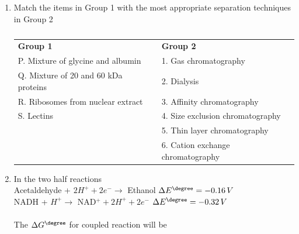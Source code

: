 \documentclass[journal,12pt,onecolumn]{IEEEtran}
\theoremstyle{remark}
\begin{document}
\begin{enumerate}
\begin{enumerate}
\end{enumerate}

\item Match the items in Group 1 with the most appropriate separation techniques in Group 2
\hfill{}

\begin{table}[h]
\centering
\begin{tabular}{ll}
\textbf{Group 1} & \textbf{Group 2} \\
P. Mixture of glycine and albumin & 1. Gas chromatography \\
Q. Mixture of 20 and 60 kDa proteins & 2. Dialysis \\
R. Ribosomes from nuclear extract & 3. Affinity chromatography \\
S. Lectins & 4. Size exclusion chromatography \\
 & 5. Thin layer chromatography \\
 & 6. Cation exchange chromatography \\
\end{tabular}
\caption*{}
\label{tab:q14}
\end{table}

\begin{enumerate}
\end{enumerate}

\item In the two half reactions \\
Acetaldehyde + $2H^+ + 2e^- \to$ Ethanol \quad $\Delta E^\degree = -0.16\,V$ \\
NADH + $H^+ \to$ NAD$^+ + 2H^+ + 2e^-$ \quad $\Delta E^\degree = -0.32\,V$ \\
 \\
The $\Delta G^\degree$ for coupled reaction will be 
\hfill{}


\end{enumerate}
\end{document}
